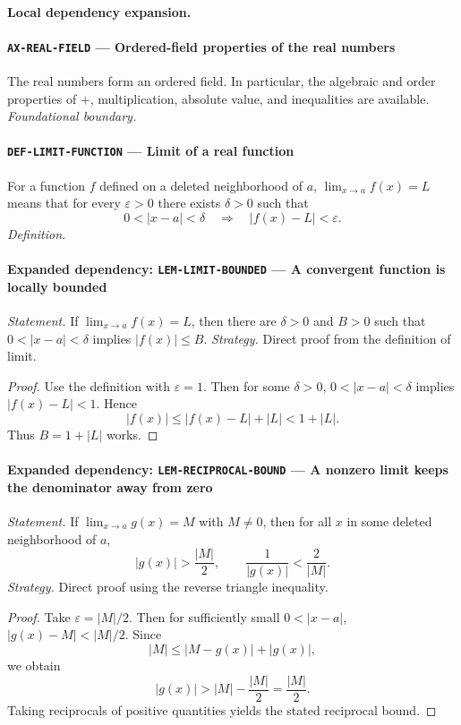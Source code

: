 \documentclass[10pt]{article}
\newcommand{\pidraw}[1]{\begingroup\urlstyle{tt}\nolinkurl{#1}\endgroup}
\theoremstyle{definition}
\theoremstyle{remark}
\begin{document}
\paragraph{Local dependency expansion.}

\paragraph{\pidraw{AX-REAL-FIELD} --- Ordered-field properties of the real numbers}
The real numbers form an ordered field. In particular, the algebraic and order properties of $+$, multiplication, absolute value, and inequalities are available.
\textit{Foundational boundary.}

\paragraph{\pidraw{DEF-LIMIT-FUNCTION} --- Limit of a real function}
For a function $f$ defined on a deleted neighborhood of $a$, $\lim_{x\to a}f(x)=L$ means that for every $\varepsilon>0$ there exists $\delta>0$ such that
\[
0<|x-a|<\delta\quad\Longrightarrow\quad |f(x)-L|<\varepsilon.
\]
\textit{Definition.}

\paragraph{Expanded dependency: \pidraw{LEM-LIMIT-BOUNDED} --- A convergent function is locally bounded}
\textit{Statement.} If $\lim_{x\to a}f(x)=L$, then there are $\delta>0$ and $B>0$ such that
$0<|x-a|<\delta$ implies $|f(x)|\le B$.
\textit{Strategy.} Direct proof from the definition of limit.
\begin{proof}Use the definition with $\varepsilon=1$. Then for some $\delta>0$,
$0<|x-a|<\delta$ implies $|f(x)-L|<1$. Hence
\[
|f(x)|\le |f(x)-L|+|L|<1+|L|.
\]
Thus $B=1+|L|$ works.\end{proof}

\paragraph{Expanded dependency: \pidraw{LEM-RECIPROCAL-BOUND} --- A nonzero limit keeps the denominator away from zero}
\textit{Statement.} If $\lim_{x\to a}g(x)=M$ with $M\ne0$, then for all $x$ in some deleted neighborhood of $a$,
\[
|g(x)|>\frac{|M|}{2},\qquad \frac1{|g(x)|}<\frac2{|M|}.
\]
\textit{Strategy.} Direct proof using the reverse triangle inequality.
\begin{proof}Take $\varepsilon=|M|/2$. Then for sufficiently small $0<|x-a|$,
$|g(x)-M|<|M|/2$. Since
\[
|M|\le |M-g(x)|+|g(x)|,
\]
we obtain
\[
|g(x)|>|M|-\frac{|M|}{2}=\frac{|M|}{2}.
\]
Taking reciprocals of positive quantities yields the stated reciprocal bound.\end{proof}
\end{document}
